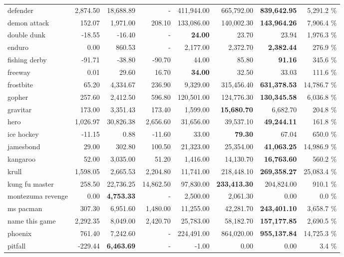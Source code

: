 \documentclass{article}
\begin{document}
\begin{table}
\begin{center}
\begin{tabularx}{0.900000\textwidth}{X| r r r r r r r}
defender &2,874.50 & 18,688.89 & - & 411,944.00 & 665,792.00 & \textbf{839,642.95} & 5,291.2 \%\\
demon attack &152.07 & 1,971.00 & 208.10 & 133,086.00 & 140,002.30 & \textbf{143,964.26} & 7,906.4 \%\\
double dunk &-18.55 & -16.40 & - & \textbf{24.00} & 23.70 & 23.94 & 1,976.3 \%\\
enduro &0.00 & 860.53 & - & 2,177.00 & 2,372.70 & \textbf{2,382.44} & 276.9 \%\\
fishing derby &-91.71 & -38.80 & -90.70 & 44.00 & 85.80 & \textbf{91.16} & 345.6 \%\\
freeway &0.01 & 29.60 & 16.70 & \textbf{34.00} & 32.50 & 33.03 & 111.6 \%\\
frostbite &65.20 & 4,334.67 & 236.90 & 9,329.00 & 315,456.40 & \textbf{631,378.53} & 14,786.7 \%\\
gopher &257.60 & 2,412.50 & 596.80 & 120,501.00 & 124,776.30 & \textbf{130,345.58} & 6,036.8 \%\\
gravitar &173.00 & 3,351.43 & 173.40 & 1,599.00 & \textbf{15,680.70} & 6,682.70 & 204.8 \%\\
hero &1,026.97 & 30,826.38 & 2,656.60 & 31,656.00 & 39,537.10 & \textbf{49,244.11} & 161.8 \%\\
ice hockey &-11.15 & 0.88 & -11.60 & 33.00 & \textbf{79.30} & 67.04 & 650.0 \%\\
jamesbond &29.00 & 302.80 & 100.50 & 21,323.00 & 25,354.00 & \textbf{41,063.25} & 14,986.9 \%\\
kangaroo &52.00 & 3,035.00 & 51.20 & 1,416.00 & 14,130.70 & \textbf{16,763.60} & 560.2 \%\\
krull &1,598.05 & 2,665.53 & 2,204.80 & 11,741.00 & 218,448.10 & \textbf{269,358.27} & 25,083.4 \%\\
kung fu master &258.50 & 22,736.25 & 14,862.50 & 97,830.00 & \textbf{233,413.30} & 204,824.00 & 910.1 \%\\
montezuma revenge &0.00 & \textbf{4,753.33} & - & 2,500.00 & 2,061.30 & 0.00 & 0.0 \%\\
ms pacman &307.30 & 6,951.60 & 1,480.00 & 11,255.00 & 42,281.70 & \textbf{243,401.10} & 3,658.7 \%\\
name this game &2,292.35 & 8,049.00 & 2,420.70 & 25,783.00 & 58,182.70 & \textbf{157,177.85} & 2,690.5 \%\\
phoenix &761.40 & 7,242.60 & - & 224,491.00 & 864,020.00 & \textbf{955,137.84} & 14,725.3 \%\\
pitfall &-229.44 & \textbf{6,463.69} & - & -1.00 & 0.00 & 0.00 & 3.4 \%\\

\end{tabularx}
\end{center}
\end{table}
\end{document}
